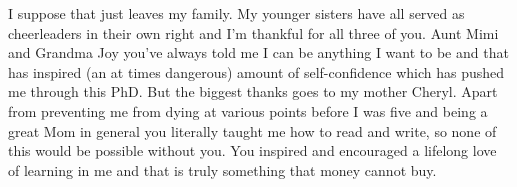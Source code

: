 I suppose that just leaves my family. My younger sisters have all served as cheerleaders in their own right and I'm thankful for all three of you. Aunt Mimi and Grandma Joy you've always told me I can be anything I want to be and that has inspired (an at times dangerous) amount of self-confidence which has pushed me through this PhD. But the biggest thanks goes to my mother Cheryl. Apart from preventing me from dying at various points before I was five and being a great Mom in general you literally taught me how to read and write, so none of this would be possible without you. You inspired and encouraged a lifelong love of learning in me and that is truly something that money cannot buy. 